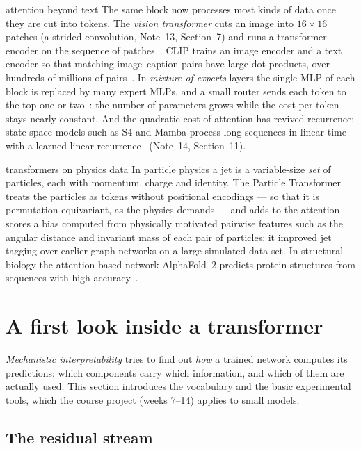 \documentclass[11pt]{article}
\begin{document}
\begin{modern}{attention beyond text}
The same block now processes most kinds of data once they are cut into tokens. The \emph{vision transformer} cuts an image
into $16 \times 16$ patches (a strided convolution, Note~13, Section~7) and runs a transformer encoder on the
sequence of patches~\cite{dosovitskiy2021}. CLIP trains an image encoder and a text encoder so that matching image--caption
pairs have large dot products, over hundreds of millions of pairs~\cite{radford2021}. In
\emph{mixture-of-experts} layers the single MLP of each block is replaced by many expert MLPs, and a small router sends each
token to the top one or two~\cite{shazeer2017,fedus2022}: the number of parameters grows while the cost per token stays
nearly constant. And the quadratic cost of attention has revived recurrence: state-space models such as S4 and Mamba process
long sequences in linear time with a learned linear recurrence~\cite{gu2022,gu2023} (Note~14, Section~11).
\end{modern}

\begin{physics}{transformers on physics data}
In particle physics a jet is a variable-size \emph{set} of particles, each with momentum, charge and identity. The Particle
Transformer~\cite{qu2022} treats the particles as tokens without positional encodings --- so that it is permutation
equivariant, as the physics demands --- and adds to the attention scores a bias computed from physically motivated pairwise
features such as the angular distance and invariant mass of each pair of particles; it improved jet tagging over earlier
graph networks on a large simulated data set. In structural biology the attention-based network AlphaFold~2 predicts protein
structures from sequences with high accuracy~\cite{jumper2021}. 
\end{physics}

\section{A first look inside a transformer}\label{sec:inside}

\emph{Mechanistic interpretability} tries to find out \emph{how} a trained network computes its predictions: which
components carry which information, and which of them are actually used. This section introduces the vocabulary and the
basic experimental tools, which the course project (weeks 7--14) applies to small models.

\subsection{The residual stream}\label{sec:stream}
\end{document}
